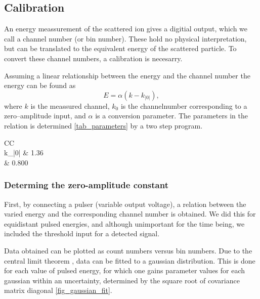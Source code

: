 \subsection{Calibration}
An energy meassurement of the scattered ion gives a digitial output, which we call
a channel number (or bin number). These hold no physical interpretation, but
can be translated to the equivalent energy of the scattered particle. To
convert these channel numbers, a calibration is necesarry. 

Assuming a linear relationship between the energy and the channel number the
energy can be found as
\begin{equation}
    E = \alpha(k - k_|0|), \label{eq_calibration}
\end{equation}
where $k$ is the meassured channel, $k_0$ is the channelnumber corresponding to
a zero--amplitude input, and $\alpha$ is a conversion parameter.
The parameters in the relation is determined \cref{tab_parameters} by a two
step program.

\begin{table}[b]
\centering
\caption{The values of the parameters, used to convert channel numbers to
energies.}
\begin{tabular}{CC}
\toprule
{}\\
\midrule
k_|0| & 1.36 \\
\alpha & 0.800  \\
\bottomrule
\end{tabular}

\label{tab_parameters}
\end{table}

\subsubsection{Determing the zero-amplitude constant}
First, by connecting a pulser (variable output voltage), a relation between the
varied energy and the corresponding channel number is obtained. 
We did this for equidistant pulsed energies, and although unimportant for the
time being, we included the threshold input for a detected signal.

Data obtained can be plotted as count numbers versus bin numbers. Due to the
central limit theorem \parencite[p. 49]{statistics}, data can be fitted to a
gaussian distribution. This is done for each value of pulsed energy, for which
one gains parameter values for each gaussian within an uncertainty, determined
by the square root of covariance matrix diagonal \cref{fig_gaussian_fit}.

